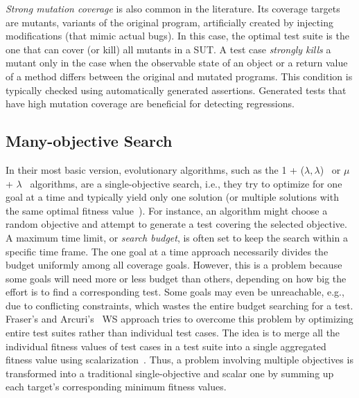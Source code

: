 \documentclass[paper=a4,%
  twoside,%
  BCOR4mm,%
  abstract=true,%
  toc=bibliography,%
  chapterprefix=true,%
  toc=bibliographynumbered,%
  open=right,%
  english,%
  pagesize=pdftex]{scrreprt}
\newcommand{\sut}{\ac{SUT}\xspace}
\begin{document}
\emph{Strong mutation coverage} is also common in the literature. Its coverage targets are mutants, variants of the original program, artificially created by injecting modifications (that mimic actual bugs). In this case, the optimal test suite is the one that can cover (or kill) all mutants in a \sut. A test case \emph{strongly kills} a mutant only in the case when the observable state of an object or a return value of a method differs between the original and mutated programs. This condition is typically checked using automatically generated assertions. Generated tests that have high mutation coverage are beneficial for detecting regressions.


\subsection{Many-objective Search}
In their most basic version, evolutionary algorithms, such as the 1 + ($\lambda,\lambda$)~\cite{Doerr2015} or $\mu$ + $\lambda$~\cite{TerSarkisov2011} algorithms, are a single-objective search, i.e., they try to optimize for one goal at a time and typically yield only one solution (or multiple solutions with the same optimal fitness value~\cite{Panichella2018}). For instance, an algorithm might choose a random objective and attempt to generate a test covering the selected objective. A maximum time limit, or \emph{search budget}, is often set to keep the search within a specific time frame. The one goal at a time approach necessarily divides the budget uniformly among all coverage goals. However, this is a problem because some goals will need more or less budget than others, depending on how big the effort is to find a corresponding test. Some goals may even be unreachable, e.g., due to conflicting constraints, which wastes the entire budget searching for a test. Fraser's and Arcuri's~\cite{Fraser_2013} \ac{WS} approach tries to overcome this problem by optimizing entire test suites rather than individual test cases. The idea is to merge all the individual fitness values of test cases in a test suite into a single aggregated fitness value using scalarization~\cite{Deb2014}. Thus, a problem involving multiple objectives is transformed into a traditional single-objective and scalar one by summing up each target's corresponding minimum fitness values. 
\end{document}
